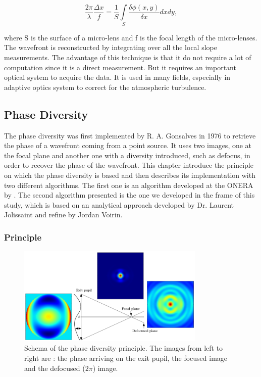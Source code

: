 \begin{equation}
\frac{2\pi}{\lambda}\frac{\Delta x}{f} = \frac{1}{S} \int\limits_S \frac{\delta\phi (x,y)}{\delta x}dxdy,
\label{eqt:SHWFSlope}
\end{equation}

where S is the surface of a micro-lens and f is the focal length of the micro-lenses. The wavefront is reconstructed by integrating over all the local slope measurements. The advantage of this technique is that it do not require a lot of computation since it is a direct measurement. But it requires an important optical system to acquire the data. It is used in many fields, especially in adaptive optics system to correct for the atmospheric turbulence.

\subsection{Phase Diversity}
\label{ch:PDThe}

The phase diversity was first implemented by R. A. Gonsalves in 1976 \citep{Gonsalves_1976,Gonsalves_1982} to retrieve the phase of a wavefront coming from a point source. It uses two images, one at the focal plane and another one with a diversity introduced, such as defocus, in order to recover the phase of the wavefront. This chapter introduce the principle on which the phase diversity is based and then describes its implementation with two different algorithms. The first one is an algorithm developed at the ONERA by \citet{mugnier_2006}. The second algorithm presented is the one we developed in the frame of this study, which is based on an analytical approach developed by Dr. Laurent Jolissaint and refine by Jordan Voirin.

\subsubsection{Principle}
\label{sec:principle}

\begin{figure}
\begin{center}
\includegraphics[width=0.8\textwidth,angle=0]{Figures/DiversityPrincipleM}
\decoRule
\caption{Schema of the phase diversity principle. The images from left to right are : the phase arriving on the exit pupil, the focused image and the defocused ($2\pi$) image.}
\label{fig:DiversityPrinciple}
\end{center}
\end{figure}

